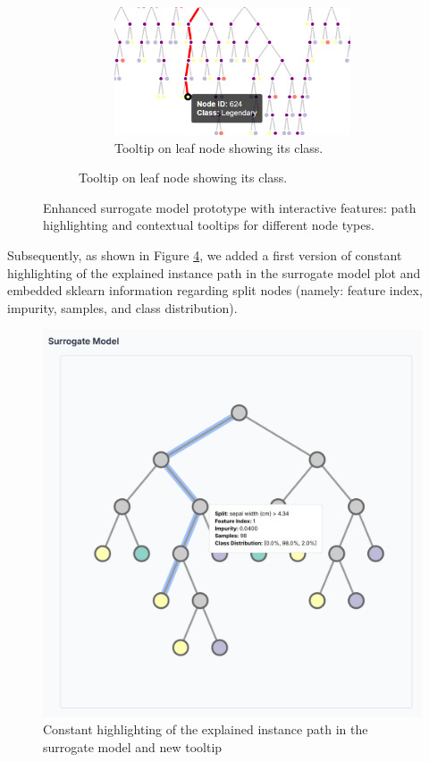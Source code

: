 \begin{figure}[htbp]
\begin{subfigure}[c]{0.3\textwidth}
        \vspace{0.02\textheight}
        
        \begin{subfigure}[c]{\textwidth}
            \centering
            \includegraphics[width=\textwidth]{images/first tooltip node.png}
            \caption{Tooltip on leaf node showing its class.}
            \label{fig:leaf-tooltip}
        \end{subfigure}

    \end{subfigure}
    \caption{Enhanced surrogate model prototype with interactive features: path highlighting and contextual tooltips for different node types.}
\end{figure}

Subsequently, as shown in Figure \ref{fig:constantHighlightTree}, we added a first version of constant highlighting of the explained instance path in the surrogate model plot \cite{git22commit} and embedded sklearn information regarding split nodes \cite{git23commit} (namely: feature index, impurity, samples, and class distribution).

\begin{figure}
    \centering
    \includegraphics[width=0.5\linewidth]{images/Costant highlight and new tooltip tree basic.png}
    \caption{Constant highlighting of the explained instance path in the surrogate model and new tooltip}
    \label{fig:constantHighlightTree}
\end{figure}

